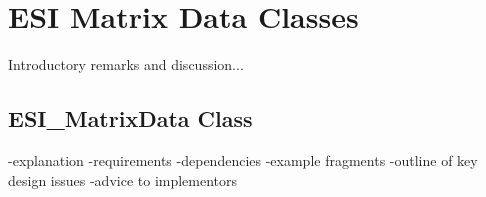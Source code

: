 \chapter{ESI Matrix Data Classes}

Introductory remarks and discussion...

\section{ESI\_MatrixData Class}

-explanation
-requirements
-dependencies
-example fragments
-outline of key design issues
-advice to implementors
